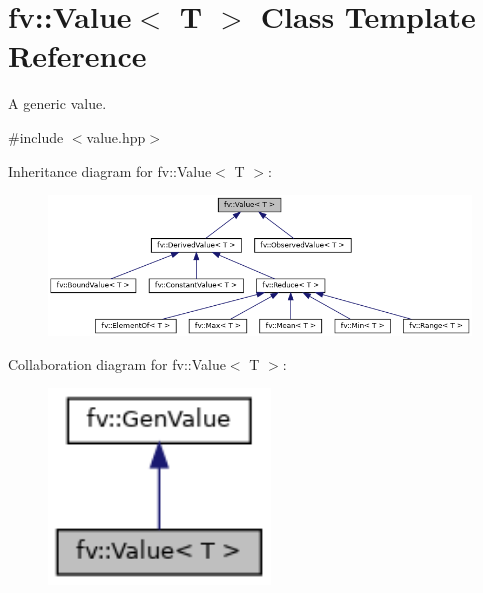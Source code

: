 \hypertarget{classfv_1_1Value}{}\section{fv\+:\+:Value$<$ T $>$ Class Template Reference}
\label{classfv_1_1Value}


A generic value.  




{\ttfamily \#include $<$value.\+hpp$>$}



Inheritance diagram for fv\+:\+:Value$<$ T $>$\+:
\nopagebreak
\begin{figure}[H]
\begin{center}
\leavevmode
\includegraphics[width=350pt]{classfv_1_1Value__inherit__graph}
\end{center}
\end{figure}


Collaboration diagram for fv\+:\+:Value$<$ T $>$\+:
\nopagebreak
\begin{figure}[H]
\begin{center}
\leavevmode
\includegraphics[width=167pt]{classfv_1_1Value__coll__graph}
\end{center}
\end{figure}
